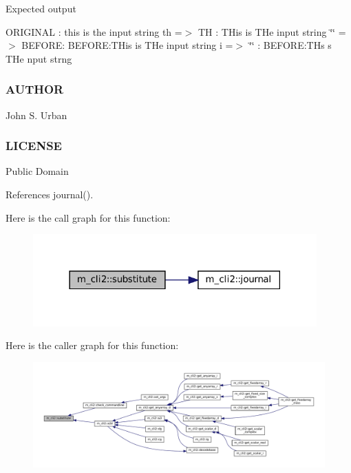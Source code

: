 Expected output

O\+R\+I\+G\+I\+N\+AL \+: this is the input string th =$>$ TH \+: T\+His is T\+He input string \char`\"{}\char`\"{} =$>$ B\+E\+F\+O\+RE\+: B\+E\+F\+O\+RE\+:T\+His is T\+He input string i =$>$ \char`\"{}\char`\"{} \+: B\+E\+F\+O\+RE\+:T\+Hs s T\+He nput strng \subsubsection*{A\+U\+T\+H\+OR}

John S. Urban \subsubsection*{L\+I\+C\+E\+N\+SE}

Public Domain 

References journal().

Here is the call graph for this function\+:\nopagebreak
\begin{figure}[H]
\begin{center}
\leavevmode
\includegraphics[width=309pt]{namespacem__cli2_a76af7f7c39e6755e024890d85d488704_cgraph}
\end{center}
\end{figure}
Here is the caller graph for this function\+:\nopagebreak
\begin{figure}[H]
\begin{center}
\leavevmode
\includegraphics[width=350pt]{namespacem__cli2_a76af7f7c39e6755e024890d85d488704_icgraph}
\end{center}
\end{figure}
\mbox{\label{namespacem__cli2_a770a66475094fd80493d46498de1ebf7}} 
